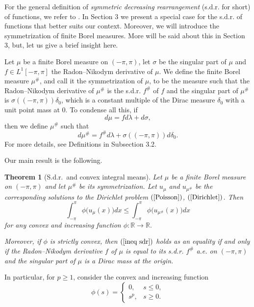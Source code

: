 \documentclass[11pt]{amsart}
\newtheorem{theorem}{Theorem}[section]
\numberwithin{equation}{section}
\begin{document}
\vspace{2mm}
For the general definition of {\it symmetric decreasing rearrangement} (s.d.r. for short) of functions, we refer to \cite{Baernstein}. In Section 3 we present a special case for the s.d.r. of functions that better suits our context. Moreover, we will introduce the symmetrization of finite Borel measures. More will be said about this in Section 3, but, let us give a brief insight here.
\par Let \(\mu\) be a finite Borel measure on \((-\pi,\pi)\), let \(\sigma\) be the singular part of \(\mu\) and \(f\in L^1[-\pi,\pi]\) the Radon--Nikodym derivative of \(\mu\). We define the finite Borel measure \(\mu^\#\), and call it the symmetrization of \(\mu\), to be the measure such that the Radon--Nikodym derivative of \(\mu^\#\) is the s.d.r. \(f^\#\) of \(f\) and the singular part of \(\mu^\#\) is \(\sigma((-\pi,\pi))\delta_0\), which is a constant multiple of the Dirac measure \(\delta_0\) with a unit point mass at 0. To condense all this, if
\begin{equation}
d\mu=fd\lambda+d\sigma,
\end{equation}
then we define \(\mu^\#\) such that
\begin{equation}
d\mu^\#=f^\#d\lambda+\sigma((-\pi,\pi))d\delta_0.
\end{equation}
For more details, see Definitions in Subsection 3.2.
\par Our main result is the following.
\begin{theorem}[S.d.r.\ and convex integral means]\label{sdrconvex}
Let \(\mu\) be a finite Borel measure on \((-\pi,\pi)\) and let \(\mu^\#\) be its symmetrization. Let \(u_\mu\) and \(u_{\mu^\#}\) be the corresponding solutions to the Dirichlet problem \((\ref{Poisson})\), \((\ref{Dirichlet})\). Then
\begin{equation}\label{ineq sdr}
\int_{-\pi}^\pi \phi\bigl(u_\mu(x)\bigr)dx\leq\int_{-\pi}^\pi \phi\bigl(u_{\mu^\#}(x)\bigr)dx
\end{equation}
for any convex and increasing function \(\phi:\mathbb{R}\to\mathbb{R}.\)
\par Moreover, if \(\phi\) is strictly convex, then \((\ref{ineq sdr})\) holds as an equality if and only if the Radon--Nikodym derivative \(f\) of \(\mu\) is equal to its s.d.r. \(f^\#\) a.e. on \((-\pi,\pi)\) and the singular part of \(\mu\) is a Dirac mass at the origin.
\end{theorem}
In particular, for \(p\geq1\), consider the convex and increasing function
\[
\phi(s)=
\begin{cases}
0, & s\leq0,\\
s^p, &s\geq0.
\end{cases}
\]
\end{document}

